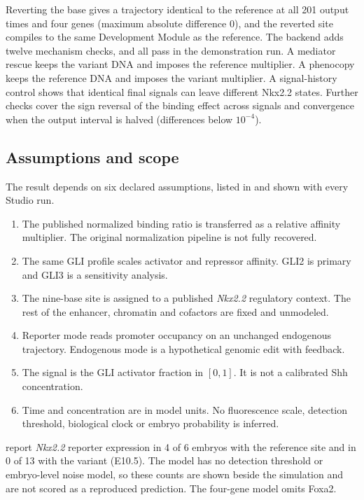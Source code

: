 \documentclass[10.5pt,a4paper]{article}
\begin{document}
Reverting the base gives a trajectory identical to the reference at all 201 output times and four genes (maximum absolute difference 0), and the reverted site compiles to the same Development Module as the reference. The backend adds twelve mechanism checks, and all pass in the demonstration run. A mediator rescue keeps the variant DNA and imposes the reference multiplier. A phenocopy keeps the reference DNA and imposes the variant multiplier. A signal-history control shows that identical final signals can leave different Nkx2.2 states. Further checks cover the sign reversal of the binding effect across signals and convergence when the output interval is halved (differences below $10^{-4}$).

\subsection{Assumptions and scope}\label{sec:assumptions}

The result depends on six declared assumptions, listed in  and shown with every Studio run.
\begin{enumerate}
\item The published normalized binding ratio is transferred as a relative affinity multiplier. The original normalization pipeline is not fully recovered.
\item The same GLI profile scales activator and repressor affinity. GLI2 is primary and GLI3 is a sensitivity analysis.
\item The nine-base site is assigned to a published \emph{Nkx2.2} regulatory context. The rest of the enhancer, chromatin and cofactors are fixed and unmodeled.
\item Reporter mode reads promoter occupancy on an unchanged endogenous trajectory. Endogenous mode is a hypothetical genomic edit with feedback.
\item The signal is the GLI activator fraction in $[0,1]$. It is not a calibrated Shh concentration.
\item Time and concentration are in model units. No fluorescence scale, detection threshold, biological clock or embryo probability is inferred.
\end{enumerate}
\citet{peterson2012} report \emph{Nkx2.2} reporter expression in 4 of 6 embryos with the reference site and in 0 of 13 with the variant (E10.5). The model has no detection threshold or embryo-level noise model, so these counts are shown beside the simulation and are not scored as a reproduced prediction. The four-gene model omits Foxa2.
\end{document}
